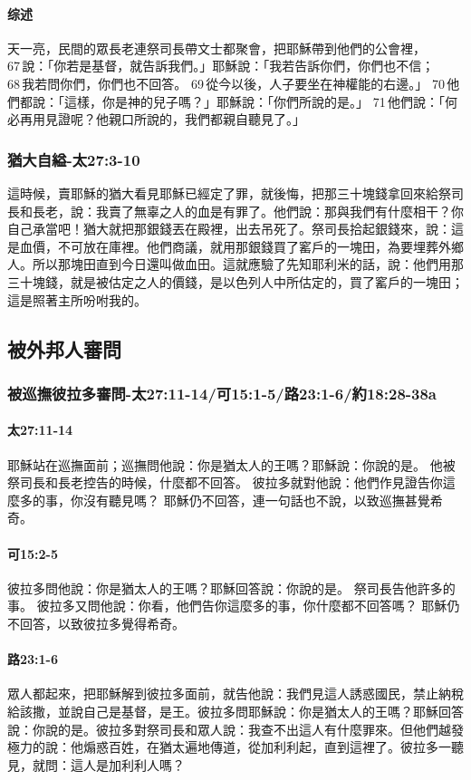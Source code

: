\paragraph{综述}
天一亮，民間的眾長老連祭司長帶文士都聚會，把耶穌帶到他們的公會裡， 67 說：「你若是基督，就告訴我們。」耶穌說：「我若告訴你們，你們也不信； 68 我若問你們，你們也不回答。 69 從今以後，人子要坐在神權能的右邊。」 70 他們都說：「這樣，你是神的兒子嗎？」耶穌說：「你們所說的是。」 71 他們說：「何必再用見證呢？他親口所說的，我們都親自聽見了。」

\subsubsection{猶大自縊-太27:3-10}
這時候，賣耶穌的猶大看見耶穌已經定了罪，就後悔，把那三十塊錢拿回來給祭司長和長老，說：我賣了無辜之人的血是有罪了。他們說：那與我們有什麼相干？你自己承當吧！猶大就把那銀錢丟在殿裡，出去吊死了。祭司長拾起銀錢來，說：這是血價，不可放在庫裡。他們商議，就用那銀錢買了窰戶的一塊田，為要埋葬外鄉人。所以那塊田直到今日還叫做血田。這就應驗了先知耶利米的話，說：他們用那三十塊錢，就是被估定之人的價錢，是以色列人中所估定的，買了窰戶的一塊田；這是照著主所吩咐我的。


\subsection{被外邦人審問}
\subsubsection{被巡撫彼拉多審問-太27:11-14/可15:1-5/路23:1-6/約18:28-38a}
\paragraph{太27:11-14}耶穌站在巡撫面前；巡撫問他說：你是猶太人的王嗎？耶穌說：你說的是。
他被祭司長和長老控告的時候，什麼都不回答。
彼拉多就對他說：他們作見證告你這麼多的事，你沒有聽見嗎？
耶穌仍不回答，連一句話也不說，以致巡撫甚覺希奇。



\paragraph{可15:2-5}
彼拉多問他說：你是猶太人的王嗎？耶穌回答說：你說的是。
祭司長告他許多的事。
彼拉多又問他說：你看，他們告你這麼多的事，你什麼都不回答嗎？
耶穌仍不回答，以致彼拉多覺得希奇。




\paragraph{路23:1-6}眾人都起來，把耶穌解到彼拉多面前，就告他說：我們見這人誘惑國民，禁止納稅給該撒，並說自己是基督，是王。彼拉多問耶穌說：你是猶太人的王嗎？耶穌回答說：你說的是。彼拉多對祭司長和眾人說：我查不出這人有什麼罪來。但他們越發極力的說：他煽惑百姓，在猶太遍地傳道，從加利利起，直到這裡了。彼拉多一聽見，就問：這人是加利利人嗎？

